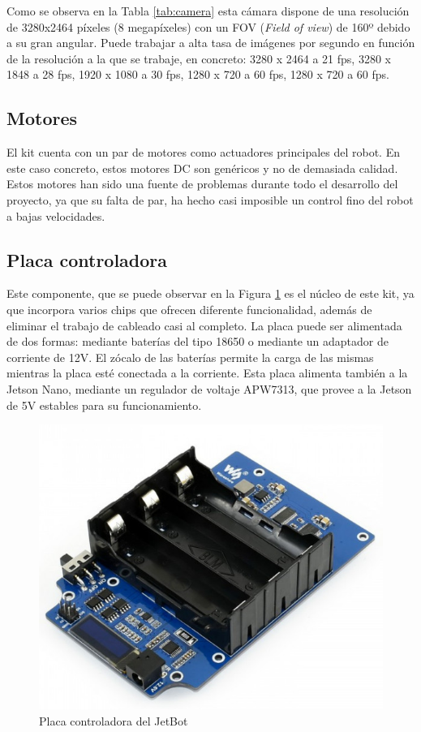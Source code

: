 Como se observa en la Tabla \ref{tab:camera} esta cámara dispone de una resolución de 3280x2464 píxeles (8 megapíxeles) con un FOV (\textit{Field of view}) de 160º debido a su gran angular. Puede trabajar a alta tasa de imágenes por segundo en función de la resolución a la que se trabaje, en concreto: 3280 x 2464 a 21 fps, 3280 x 1848 a 28 fps, 1920 x 1080 a 30 fps, 1280 x 720 a 60 fps, 1280 x 720 a 60 fps.


\subsection{Motores}

El kit cuenta con un par de motores como actuadores principales del robot. En este caso concreto, estos motores DC son genéricos y no de demasiada calidad. Estos motores han sido una fuente de problemas durante todo el desarrollo del proyecto, ya que su falta de par, ha hecho casi imposible un control fino del robot a bajas velocidades.

\subsection{Placa controladora}

Este componente, que se puede observar en la Figura \ref{fig:waveboard} es el núcleo de este kit, ya que incorpora varios chips que ofrecen diferente funcionalidad, además de eliminar el trabajo de cableado casi al completo. La placa puede ser alimentada de dos formas: mediante baterías del tipo 18650 o mediante un adaptador de corriente de 12V. El zócalo de las baterías permite la carga de las mismas mientras la placa esté conectada a la corriente. Esta placa alimenta también a la Jetson Nano, mediante un regulador de voltaje APW7313, que provee a la Jetson de 5V estables para su funcionamiento.

\begin{figure}
  \centering
  \includegraphics[width=.5\linewidth]{img/waveshare_board}
  \caption{Placa controladora del JetBot}
  \label{fig:waveboard}
\end{figure}

